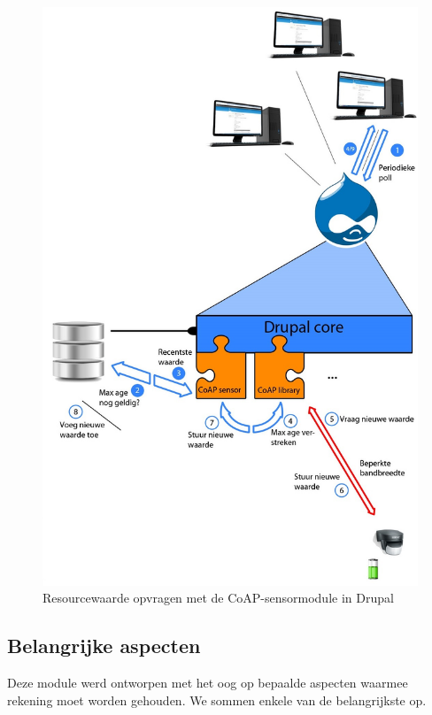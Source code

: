 \begin{figure}
\includegraphics[width=1\textwidth]{fig/architectuur}
\caption{Resourcewaarde opvragen met de CoAP-sensormodule in Drupal}
\label{fig:architectuur}
\end{figure}

\newpage
\subsection{Belangrijke aspecten} \label{aspecten}

Deze module werd ontworpen met het oog op bepaalde aspecten waarmee rekening moet worden gehouden. We sommen enkele van de belangrijkste op.

